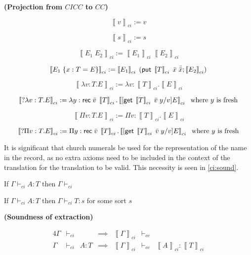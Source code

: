 \newcommand{\CICCproj}[1]{ \left\llbracket #1 \right\rrbracket_{ci}}

\begin{definition}
\textbf{ (Projection from $CICC$ to $CC$) }

\[
\CICCproj{v} := v
\]

\[
\CICCproj{s} := s
\]

\[
\CICCproj{E_1 \; E_2} := \CICCproj{E_1} \; \CICCproj{E_2}
\]

\[
\CICCproj{E_1 \; \{ x : T = E \}} := \CICCproj{E_1} \; (\m{put}\;\CICCproj{T}\;\bar{x}\; \bar{\bar{x}}; \CICCproj{E_2} )
\]

\[
\CICCproj{\lambda v : T . E } := \lambda v : \CICCproj{T} . \CICCproj{E}
\]

\[
\CICCproj{?\lambda v : T . E } := \lambda y : \m{rec}\;\bar{v}\; \CICCproj{T} . \CICCproj{ [ \m{get}\; \CICCproj{T}\; \bar{v}\; y  / v ] E}
\;\text{ where $y$ is fresh}
\] 

\[
\CICCproj{\Pi v : T . E } := \Pi v : \CICCproj{T} . \CICCproj{E}
\]

\[
\CICCproj{?\Pi v : T . E } := \Pi y : \m{rec}\;\bar{v}\;\CICCproj{T} . \CICCproj{ [ \m{get}\;\CICCproj{T}\; \bar{v}\; y  / v ] E}
\;\text{ where $y$ is fresh}
\]

\label{cicc:proj}
\end{definition}

It is significant that church numerals be used for the representation of the name in the record, 
as no extra axioms need to be included in the context of the translation for the translation to be valid.  
This necessity is seen in \ref{ci:sound}.

\begin{lemma}

If $\Gamma \vdash_{ci} A : T$ then $\Gamma \vdash_{ci}$

\label{ci:wfctxt}
\end{lemma}

\begin{lemma}

If $\Gamma \vdash_{ci} A : T$ then $\Gamma \vdash_{ci} T : s$ for some sort $s$

\label{ci:wtt}
\end{lemma}

\begin{theorem}

\textbf{(Soundness of extraction)}  

\begin{alignat}{4}
\Gamma &\vdash_{ci}&  & \implies & \CICCproj{\Gamma} & \vdash_{cc} &
\\
\Gamma &\vdash_{ci}& A : T & \implies & \CICCproj{\Gamma} & \vdash_{cc} & \CICCproj{A} : \CICCproj{ T }
\end{alignat}

\label{ci:sound}
\end{theorem}

